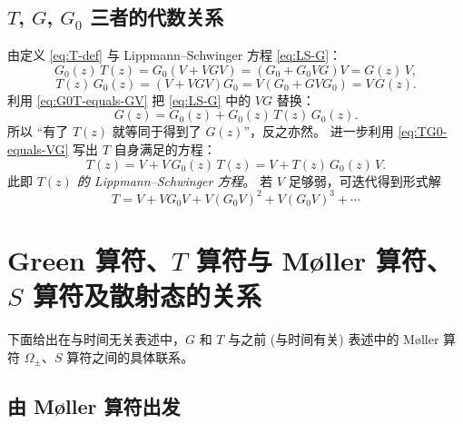 \subsection{$T$, $G$, $G_0$ 三者的代数关系}

由定义 \eqref{eq:T-def} 与 Lippmann--Schwinger 方程 \eqref{eq:LS-G}：
\begin{equation}\label{eq:G0T-equals-GV}
  G_0(z)\,T(z) = G_0(V + VGV) = (G_0 + G_0 V G)V = G(z)\,V,
\end{equation}
\begin{equation}\label{eq:TG0-equals-VG}
  T(z)\,G_0(z) = (V + VGV)G_0 = V(G_0 + G V G_0) = V\,G(z).
\end{equation}
利用 \eqref{eq:G0T-equals-GV} 把 \eqref{eq:LS-G} 中的 $VG$ 替换：
\begin{equation}\label{eq:G-via-T}
  \boxed{\,G(z) = G_0(z) + G_0(z)\,T(z)\,G_0(z).\,}
\end{equation}
所以 ``有了 $T(z)$ 就等同于得到了 $G(z)$''，反之亦然。
进一步利用 \eqref{eq:TG0-equals-VG} 写出 $T$ 自身满足的方程：
\begin{equation}\label{eq:LS-T}
  \boxed{\,T(z) = V + V\,G_0(z)\,T(z) = V + T(z)\,G_0(z)\,V.\,}
\end{equation}
此即 \emph{$T(z)$ 的 Lippmann--Schwinger 方程}。
若 $V$ 足够弱，可迭代得到形式解
\begin{equation}\label{eq:T-Born}
  T = V + V G_0 V + V (G_0 V)^2 + V (G_0 V)^3 + \cdots
\end{equation}

\section{Green 算符、$T$ 算符与 M\o ller 算符、$S$ 算符及散射态的关系}\label{sec:moller}

下面给出在与时间无关表述中，$G$ 和 $T$ 与之前 (与时间有关) 表述中的
M\o ller 算符 $\Omega_\pm$、$S$ 算符之间的具体联系。

\subsection{由 M\o ller 算符出发}


